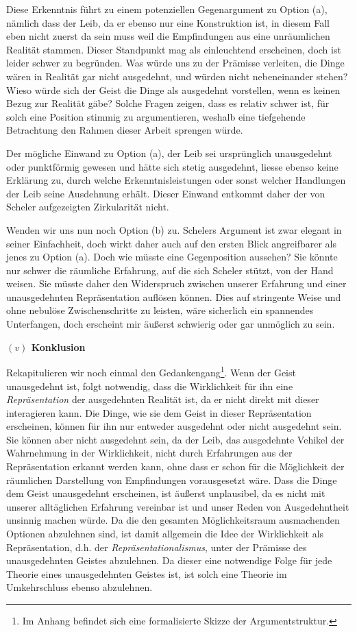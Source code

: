 \documentclass[a4paper, 12pt]{article}
\begin{document}
\begin{onehalfspace}
Diese Erkenntnis führt zu einem potenziellen Gegenargument zu Option (a), nämlich dass der Leib, da er ebenso nur eine Konstruktion ist, in diesem Fall eben nicht zuerst da sein muss weil die Empfindungen aus eine unräumlichen Realität stammen. Dieser Standpunkt mag als einleuchtend erscheinen, doch ist leider schwer zu begründen. Was würde uns zu der Prämisse verleiten, die Dinge wären in Realität gar nicht ausgedehnt, und würden nicht nebeneinander stehen? Wieso würde sich der Geist die Dinge als ausgedehnt vorstellen, wenn es keinen Bezug zur Realität gäbe? Solche Fragen zeigen, dass es relativ schwer ist, für solch eine Position stimmig zu argumentieren, weshalb eine tiefgehende Betrachtung den Rahmen dieser Arbeit sprengen würde.

Der mögliche Einwand zu Option (a), der Leib sei ursprünglich unausgedehnt oder punktförmig gewesen und hätte sich stetig ausgedehnt, liesse ebenso keine Erklärung zu, durch welche Erkenntnisleistungen oder sonst welcher Handlungen der Leib seine Ausdehnung erhält. Dieser Einwand entkommt daher der von Scheler aufgezeigten Zirkularität nicht.

Wenden wir uns nun noch Option (b) zu. Schelers Argument ist zwar elegant in seiner Einfachheit, doch wirkt daher auch auf den ersten Blick angreifbarer als jenes zu Option (a). Doch wie müsste eine Gegenposition aussehen? Sie könnte nur schwer die räumliche Erfahrung, auf die sich Scheler stützt, von der Hand weisen. Sie müsste daher den Widerspruch zwischen unserer Erfahrung und einer unausgedehnten Repräsentation auflösen können. Dies auf stringente Weise und ohne nebulöse Zwischenschritte zu leisten, wäre sicherlich ein spannendes Unterfangen, doch erscheint mir äußerst schwierig oder gar unmöglich zu sein.

\vspace{5mm}
\noindent\textbf{$(v)$ Konklusion}

\noindent Rekapitulieren wir noch einmal den Gedankengang\footnote{Im Anhang befindet sich eine formalisierte Skizze der Argumentstruktur.}. Wenn der Geist unausgedehnt ist, folgt notwendig, dass die Wirklichkeit für ihn eine \emph{Repräsentation} der ausgedehnten Realität ist, da er nicht direkt mit dieser interagieren kann. Die Dinge, wie sie dem Geist in dieser Repräsentation erscheinen, können für ihn nur entweder ausgedehnt oder nicht ausgedehnt sein. Sie können aber nicht ausgedehnt sein, da der Leib, das ausgedehnte Vehikel der Wahrnehmung in der Wirklichkeit, nicht durch Erfahrungen aus der Repräsentation erkannt werden kann, ohne dass er schon für die Möglichkeit der räumlichen Darstellung von Empfindungen vorausgesetzt wäre. Dass die Dinge dem Geist unausgedehnt erscheinen, ist äußerst unplausibel, da es nicht mit unserer alltäglichen Erfahrung vereinbar ist und unser Reden von Ausgedehntheit unsinnig machen würde. Da die den gesamten Möglichkeitsraum ausmachenden Optionen abzulehnen sind, ist damit allgemein die Idee der Wirklichkeit als Repräsentation, d.h. der \emph{Repräsentationalismus}, unter der Prämisse des unausgedehnten Geistes abzulehnen. Da dieser eine notwendige Folge für jede Theorie eines unausgedehnten Geistes ist, ist solch eine Theorie im Umkehrschluss ebenso abzulehnen.


\end{onehalfspace}
\end{document}
